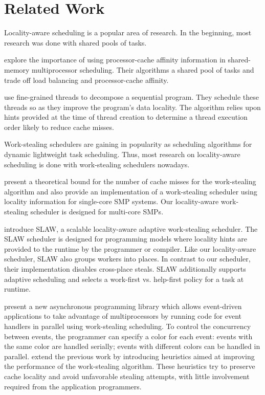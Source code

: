 
\chapter{Related Work}
\label{chap:locality-related-work}

Locality-aware scheduling is a popular area of research. In the
beginning, most research was done with shared pools of tasks.

\textcite{Squillante1993} explore the importance of using
processor-cache affinity information in shared-memory multiprocessor
scheduling. Their algorithms a shared pool of tasks and trade off load
balancing and processor-cache affinity.

\textcite{Philbin1996} use fine-grained threads to decompose a
sequential program. They schedule these threads so as they improve the
program's data locality. The algorithm relies upon hints provided at
the time of thread creation to determine a thread execution order
likely to reduce cache misses.

Work-stealing schedulers are gaining in popularity as scheduling
algorithms for dynamic lightweight task scheduling. Thus, most
research on locality-aware scheduling is done with work-stealing
schedulers nowadays.

\textcite{Acar2000} present a theoretical bound for the number of
cache misses for the work-stealing algorithm and also provide an
implementation of a work-stealing scheduler using locality information
for single-core SMP systems. Our locality-aware work-stealing
scheduler is designed for multi-core SMPs.

\textcite{Guo2010} introduce SLAW, a scalable locality-aware adaptive
work-stealing scheduler. The SLAW scheduler is designed for
programming models where locality hints are provided to the runtime by
the programmer or compiler. Like our locality-aware scheduler, SLAW
also groups workers into places. In contrast to our scheduler, their
implementation disables cross-place steals. SLAW additionally supports
adaptive scheduling and selects a work-first vs. help-first policy for
a task at runtime.

\textcite{Zeldovich2003} present a new asynchronous programming
library which allows event-driven applications to take advantage of
multiprocessors by running code for event handlers in parallel using
work-stealing scheduling. To control the concurrency between events,
the programmer can specify a color for each event: events with the
same color are handled serially; events with different colors can be
handled in parallel. \textcite{Gaud2010} extend the previous work by
introducing heuristics aimed at improving the performance of the
work-stealing algorithm. These heuristics try to preserve cache
locality and avoid unfavorable stealing attempts, with little
involvement required from the application programmers.



